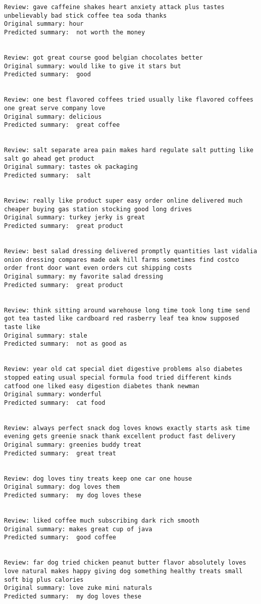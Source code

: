 \documentclass[11pt]{article}
\begin{document}
    \begin{Verbatim}[commandchars=\\\{\}]
Review: gave caffeine shakes heart anxiety attack plus tastes unbelievably bad stick coffee tea soda thanks 
Original summary: hour 
Predicted summary:  not worth the money


Review: got great course good belgian chocolates better 
Original summary: would like to give it stars but 
Predicted summary:  good


Review: one best flavored coffees tried usually like flavored coffees one great serve company love 
Original summary: delicious 
Predicted summary:  great coffee


Review: salt separate area pain makes hard regulate salt putting like salt go ahead get product 
Original summary: tastes ok packaging 
Predicted summary:  salt


Review: really like product super easy order online delivered much cheaper buying gas station stocking good long drives 
Original summary: turkey jerky is great 
Predicted summary:  great product


Review: best salad dressing delivered promptly quantities last vidalia onion dressing compares made oak hill farms sometimes find costco order front door want even orders cut shipping costs 
Original summary: my favorite salad dressing 
Predicted summary:  great product


Review: think sitting around warehouse long time took long time send got tea tasted like cardboard red rasberry leaf tea know supposed taste like 
Original summary: stale 
Predicted summary:  not as good as


Review: year old cat special diet digestive problems also diabetes stopped eating usual special formula food tried different kinds catfood one liked easy digestion diabetes thank newman 
Original summary: wonderful 
Predicted summary:  cat food


Review: always perfect snack dog loves knows exactly starts ask time evening gets greenie snack thank excellent product fast delivery 
Original summary: greenies buddy treat 
Predicted summary:  great treat


Review: dog loves tiny treats keep one car one house 
Original summary: dog loves them 
Predicted summary:  my dog loves these


Review: liked coffee much subscribing dark rich smooth 
Original summary: makes great cup of java 
Predicted summary:  good coffee


Review: far dog tried chicken peanut butter flavor absolutely loves love natural makes happy giving dog something healthy treats small soft big plus calories 
Original summary: love zuke mini naturals 
Predicted summary:  my dog loves these



\end{Verbatim}
\end{document}
